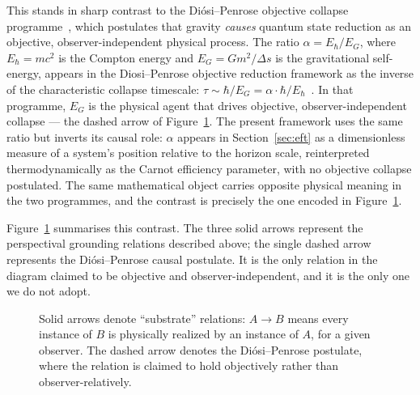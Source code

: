 \documentclass[12pt,a4paper]{article}
\begin{document}
This stands in sharp contrast to the Di\'osi--Penrose objective collapse programme~\cite{penrose1996gravity, diosi1987universal}, which postulates that gravity \emph{causes} quantum state reduction as an objective, observer-independent physical process. The ratio $\alpha = E_\hbar / E_G$, where $E_\hbar = mc^2$ is 
the Compton energy and $E_G = Gm^2/\Delta s$ is the 
gravitational self-energy, appears in the Diosi--Penrose 
objective reduction framework as the inverse of the 
characteristic collapse timescale: $\tau \sim \hbar/E_G = 
\alpha \cdot \hbar/E_\hbar$~\cite{penrose1996gravity, 
diosi1987universal}. In that programme, $E_G$ is the 
physical agent that drives objective, observer-independent 
collapse --- the dashed arrow of Figure~\ref{fig:diagram}. 
The present framework uses the same ratio but inverts its 
causal role: $\alpha$ appears in Section~\ref{sec:eft} as 
a dimensionless measure of a system's position relative to 
the horizon scale, reinterpreted thermodynamically as the 
Carnot efficiency parameter, with no objective collapse 
postulated. The same mathematical object carries opposite 
physical meaning in the two programmes, and the contrast 
is precisely the one encoded in Figure~\ref{fig:diagram}.




Figure~\ref{fig:diagram} summarises this contrast. The three solid arrows represent the perspectival grounding relations described above; the single dashed arrow represents the Di\'osi--Penrose causal postulate. It is the only relation in the diagram claimed to be objective and observer-independent, and it is the only one we do not adopt.

\begin{figure}[h]
\centering
{}
\caption{Solid arrows denote ``substrate'' relations: $A \to B$ means every instance of $B$ is physically realized by an instance of $A$, for a given observer. The dashed arrow denotes the Di\'osi--Penrose postulate, where the relation is claimed to hold objectively rather than observer-relatively.}
\label{fig:diagram}
\end{figure}
\end{document}
